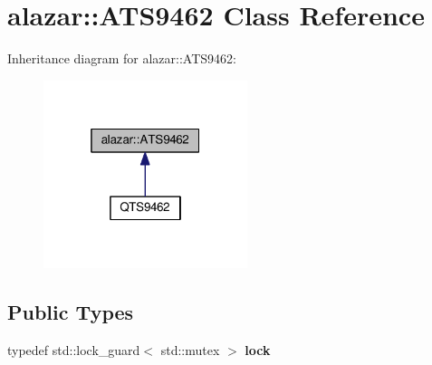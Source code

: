 \hypertarget{classalazar_1_1_a_t_s9462}{}\section{alazar\+:\+:A\+T\+S9462 Class Reference}
\label{classalazar_1_1_a_t_s9462}


Inheritance diagram for alazar\+:\+:A\+T\+S9462\+:
\nopagebreak
\begin{figure}[H]
\begin{center}
\leavevmode
\includegraphics[width=169pt]{classalazar_1_1_a_t_s9462__inherit__graph}
\end{center}
\end{figure}
\subsection*{Public Types}
\begin{DoxyCompactItemize}
\item 
typedef std\+::lock\+\_\+guard$<$ std\+::mutex $>$ {\bfseries lock}\hypertarget{classalazar_1_1_a_t_s9462_a735d1f33b2ef63beda54f2d8bde5fd65}{}\label{classalazar_1_1_a_t_s9462_a735d1f33b2ef63beda54f2d8bde5fd65}

\end{DoxyCompactItemize}
